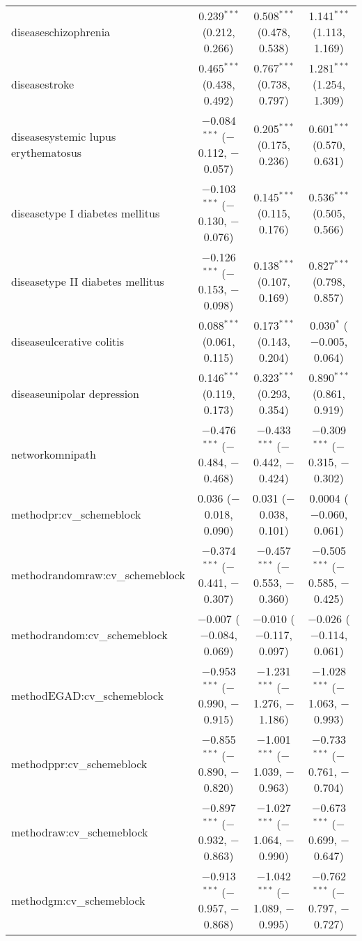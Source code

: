 \begin{table}[!htbp]
\begin{tabular}{@{\extracolsep{5pt}}lccc}
  diseaseschizophrenia & 0.239$^{***}$ (0.212, 0.266) & 0.508$^{***}$ (0.478, 0.538) & 1.141$^{***}$ (1.113, 1.169) \\ 
  diseasestroke & 0.465$^{***}$ (0.438, 0.492) & 0.767$^{***}$ (0.738, 0.797) & 1.281$^{***}$ (1.254, 1.309) \\ 
  diseasesystemic lupus erythematosus & $-$0.084$^{***}$ ($-$0.112, $-$0.057) & 0.205$^{***}$ (0.175, 0.236) & 0.601$^{***}$ (0.570, 0.631) \\ 
  diseasetype I diabetes mellitus & $-$0.103$^{***}$ ($-$0.130, $-$0.076) & 0.145$^{***}$ (0.115, 0.176) & 0.536$^{***}$ (0.505, 0.566) \\ 
  diseasetype II diabetes mellitus & $-$0.126$^{***}$ ($-$0.153, $-$0.098) & 0.138$^{***}$ (0.107, 0.169) & 0.827$^{***}$ (0.798, 0.857) \\ 
  diseaseulcerative colitis & 0.088$^{***}$ (0.061, 0.115) & 0.173$^{***}$ (0.143, 0.204) & 0.030$^{*}$ ($-$0.005, 0.064) \\ 
  diseaseunipolar depression & 0.146$^{***}$ (0.119, 0.173) & 0.323$^{***}$ (0.293, 0.354) & 0.890$^{***}$ (0.861, 0.919) \\ 
  networkomnipath & $-$0.476$^{***}$ ($-$0.484, $-$0.468) & $-$0.433$^{***}$ ($-$0.442, $-$0.424) & $-$0.309$^{***}$ ($-$0.315, $-$0.302) \\ 
  methodpr:cv\_schemeblock & 0.036 ($-$0.018, 0.090) & 0.031 ($-$0.038, 0.101) & 0.0004 ($-$0.060, 0.061) \\ 
  methodrandomraw:cv\_schemeblock & $-$0.374$^{***}$ ($-$0.441, $-$0.307) & $-$0.457$^{***}$ ($-$0.553, $-$0.360) & $-$0.505$^{***}$ ($-$0.585, $-$0.425) \\ 
  methodrandom:cv\_schemeblock & $-$0.007 ($-$0.084, 0.069) & $-$0.010 ($-$0.117, 0.097) & $-$0.026 ($-$0.114, 0.061) \\ 
  methodEGAD:cv\_schemeblock & $-$0.953$^{***}$ ($-$0.990, $-$0.915) & $-$1.231$^{***}$ ($-$1.276, $-$1.186) & $-$1.028$^{***}$ ($-$1.063, $-$0.993) \\ 
  methodppr:cv\_schemeblock & $-$0.855$^{***}$ ($-$0.890, $-$0.820) & $-$1.001$^{***}$ ($-$1.039, $-$0.963) & $-$0.733$^{***}$ ($-$0.761, $-$0.704) \\ 
  methodraw:cv\_schemeblock & $-$0.897$^{***}$ ($-$0.932, $-$0.863) & $-$1.027$^{***}$ ($-$1.064, $-$0.990) & $-$0.673$^{***}$ ($-$0.699, $-$0.647) \\ 
  methodgm:cv\_schemeblock & $-$0.913$^{***}$ ($-$0.957, $-$0.868) & $-$1.042$^{***}$ ($-$1.089, $-$0.995) & $-$0.762$^{***}$ ($-$0.797, $-$0.727) \\ 

\end{tabular}
\end{table}

